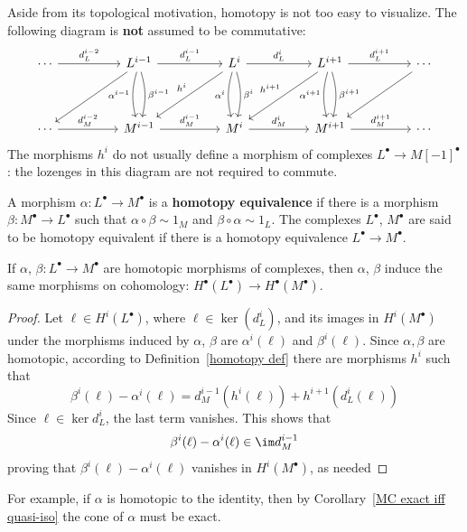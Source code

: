 Aside from its topological motivation, homotopy is not too easy to visualize. The following diagram is \textbf{not} assumed to be commutative:
\[\begin{tikzcd}
\cdots\ar[rr,"d_L^{i-2}"]&&L^{i-1}\ar[dd,swap,bend right=15,"\alpha^{i-1}"]\ar[lldd]\ar[dd,bend left=15,"\beta^{i-1}"]\ar[rr,"d_L^{i-1}"]&&L^i\ar[rr,"d_L^{i}"]
\ar[lldd,swap,"h^i"]\ar[dd,swap,bend right=15,"\alpha^{i}"]\ar[dd,bend left=15,"\beta^{i}"]&&L^{i+1}\ar[rr,"d_L^{i+1}"]\ar[lldd,swap,"h^{i+1}"]
\ar[dd,swap,bend right=15,"\alpha^{i+1}"]\ar[dd,bend left=15,"\beta^{i+1}"]&&\cdots\ar[lldd]\\
&&&&&&&&\\
\cdots\ar[rr,"d_M^{i-2}"]&&M^{i-1}\ar[rr,"d_M^{i-1}"]&&M^i\ar[rr,"d_M^{i}"]&&M^{i+1}\ar[rr,"d_M^{i+1}"]&&\cdots
\end{tikzcd}\]
The morphisms $h^i$ do not usually define a morphism of complexes $L^\bullet\to M[-1]^\bullet$: the lozenges in this diagram are not required to commute.
\begin{definition}\label{homotopy def}
A morphism $\alpha:L^\bullet\to M^\bullet$ is a \textbf{homotopy equivalence} if there is a morphism $\beta:M^\bullet\to L^\bullet$ such that $\alpha\circ\beta\sim 1_M$ and $\beta\circ\alpha\sim 1_L$. The complexes $L^\bullet$, $M^\bullet$ are said to be homotopy equivalent if there is a homotopy equivalence $L^\bullet\to M^\bullet$.
\end{definition}
\begin{proposition}\label{homotopic morphism on cohomology}
If $\alpha$, $\beta:L^\bullet\to M^\bullet$ are homotopic morphisms of complexes, then $\alpha$, $\beta$ induce the same morphisms on cohomology: 
$H^\bullet(L^\bullet)\to H^\bullet(M^\bullet)$.
\end{proposition}
\begin{proof}
Let $\ell\in H^i(L^\bullet)$, where $\ell\in\ker(d^i_L)$, and its images in $H^i(M^\bullet)$ under the morphisms induced by $\alpha$, $\beta$ are $\alpha^i(\ell)$ and 
$\beta^i(\ell)$. Since $\alpha,\beta$ are homotopic, according to Definition~\ref{homotopy def} there are morphisms $h^i$ such that
\[\beta^i(\ell)-\alpha^i(\ell)=d_M^{i-1}(h^i(\ell))+h^{i+1}(d_L^i(\ell))\]
Since $\ell\in\ker d^i_L$, the last term vanishes. This shows that
\[\beta^i(\ell)-\alpha^i(\ell)\in\im d_M^{i-1}\]
proving that $\beta^i(\ell)-\alpha^i(\ell)$ vanishes in $H^i(M^\bullet)$, as needed
\end{proof}
For example, if $\alpha$ is homotopic to the identity, then by Corollary~\ref{MC exact iff quasi-iso} the cone of $\alpha$ must be exact.

